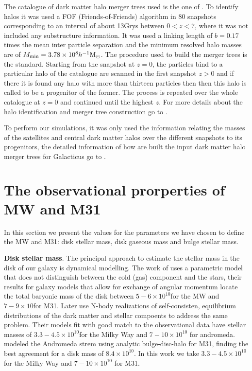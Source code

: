 \documentclass[usenatbib]{mn2e}
\newcommand{\hMsun}{{\ifmmode{h^{-1}{\rm {M_{\odot}}}}\else{$h^{-1}{\rm{M_{\odot}}}$}\fi}}
\newcommand{\Msun}{{\ifmmode{{\rm {M_{\odot}}}}\else{${\rm{M_{\odot}}}$}\fi}}
\begin{document}
The catalogue of dark matter halo merger trees used is the one of \cite{2011arXiv1107.0017F}. To identify halos it was used a FOF (Friends-of-Friends) algorithm 
in 80 snapshots corresponding to an interval of about 13Grys between $0<z<7$, where it was not included any substructure information. It was used a linking length of 
$b=0.17$ times the mean inter particle separation and the minimum resolved halo masses are of $M_{\text{min}}=3.78\times 10^8 \hMsun$. The procedure used to build the
 merger trees is the standard. Starting from the snapshot at $z=0$, the particles bind to a particular  halo of the catalogue are scanned in the first snapshot $z>0$ 
and if there it is found any halo with more than thirteen particles then then this halo is called to be a progenitor of the former. The process is repeated over the whole
catalogue at $z=0$ and continued until the highest $z$. For more details about the halo identification and merger tree construction go to \cite{2011arXiv1107.0017F}.
 

 To perform our simulations, it was only used the information relating the masses of the satellites and central dark matter halos over the different snapshots to its 
progenitors, the detailed information of how are built the input dark matter halo merger trees for Galacticus go to \cite{2010arXiv1008.1786B}.

\section{The observational prorperties of MW and M31}  
\label{sec:discussion}  

In this section we present the values for the parameters we have chosen to define the MW and M31: disk stellar mass, disk gaseous mass and bulge stellar mass.

{\bf Disk stellar mass}. The principal approach to estimate the stellar mass in the disk of our galaxy is dynamical modelling. The work of \cite{Klypin2002} uses a parametric model
 that does not distinguish between the cold (gas) component and the stars, their results for galaxy models that allow for exchange of angular momentum locate the total baryonic mass
 of the disk between $5-6\times 10^{10}$\Msun for the MW and $7-9\times 10$\Msun for M31. Later \cite{Widrow2005} use N-body realizations of self-consisten, equilibrium distributions 
of the dark matter and stellar compoents to address the same problem. Their models fit with good match to the observational data have stellar masses of $3.3-4.5\times 10^{10}$\Msun for 
the Milky Way and $7-10\times 10^{10}$ for andromeda. \citep{Geehan2006} modeled the Andromeda strem using analytic bulge-disc-halo for M31, finding the best agreement for a disk 
mass of $8.4\times 10^{10}$\Msun. In this work we take $3.3-4.5\times 10^{10}$\Msun for the Milky Way and $7-10\times 10^{10}$ for M31.  
\end{document}
